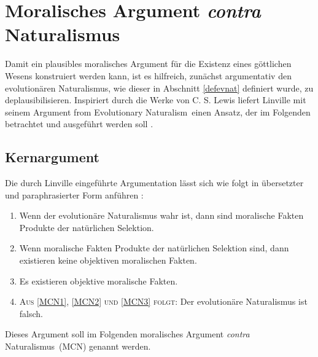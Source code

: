 \documentclass[a4paper,11pt]{article}
\numberwithin{equation}{section}
\begin{document}
\section{Moralisches Argument \textit{contra} Naturalismus}
Damit ein plausibles moralisches Argument für die Existenz eines göttlichen Wesens konstruiert werden kann, ist es hilfreich, zunächst argumentativ den evolutionären Naturalismus, wie dieser in Abschnitt \ref{defevnat} definiert wurde, zu deplausibilisieren. Inspiriert durch die Werke von C. S. Lewis liefert Linville mit seinem \flqq Argument from Evolutionary Naturalism\frqq\ einen Ansatz, der im Folgenden betrachtet und ausgeführt werden soll \cite[S. 393-417]{Linville2009-LINTMA-2}.

\subsection{Kernargument}\label{Kernargument}
Die durch Linville eingeführte Argumentation lässt sich wie folgt in übersetzter und paraphrasierter Form anführen \cite[S. 394]{Linville2009-LINTMA-2}:
\begin{enumerate}
\item Wenn der evolutionäre Naturalismus wahr ist, dann sind moralische Fakten Produkte der natürlichen Selektion.
\item Wenn moralische Fakten Produkte der natürlichen Selektion sind, dann existieren keine objektiven moralischen Fakten.
\item Es existieren objektive moralische Fakten.
\item \textsc{Aus \ref{MCN1}, \ref{MCN2} und \ref{MCN3} folgt}: Der evolutionäre Naturalismus ist falsch.
\end{enumerate}
Dieses Argument soll im Folgenden \flqq moralisches Argument \textit{contra} Naturalismus\frqq\ (MCN) genannt werden.
\end{document}
